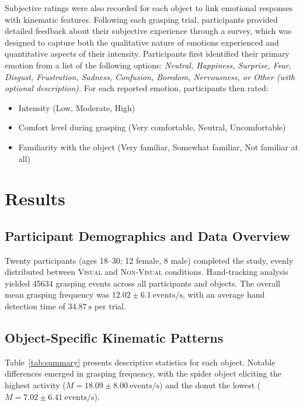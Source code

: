 \documentclass[conference]{IEEEtran}
\begin{document}
Subjective ratings were also recorded for each object to link emotional responses with kinematic features. Following each grasping trial, participants provided detailed feedback about their subjective experience through a survey, which was designed to capture both the qualitative nature of emotions experienced and quantitative aspects of their intensity.
Participants first identified their primary emotion from a list of the following options: \textit{Neutral, Happiness, Surprise, Fear, Disgust, Frustration, Sadness, Confusion, Boredom, Nervousness, or Other (with optional description).}
For each reported emotion, participants then rated:

\begin{itemize}
    \item Intensity (Low, Moderate, High)
    \item Comfort level during grasping (Very comfortable, Neutral, Uncomfortable)
    \item Familiarity with the object (Very familiar, Somewhat familiar, Not familiar at all)
\end{itemize}




\section{Results}
\label{sec:results}

\subsection{Participant Demographics and Data Overview}

Twenty participants (ages 18--30; 12 female, 8 male) completed the study, 
evenly distributed between \textsc{Visual} and \textsc{Non-Visual} conditions.
Hand-tracking analysis yielded \num{45634} grasping events across all 
participants and objects. The overall mean grasping frequency was 
$12.02 \pm 6.1\ \text{events/s}$, with an average hand detection time of 
$34.87\ \text{s}$ per trial.

\subsection{Object-Specific Kinematic Patterns}

Table~\ref{tab:summary} presents descriptive statistics for each object.
Notable differences emerged in grasping frequency, with the spider object 
eliciting the highest activity ($M = 18.09 \pm 8.00\ \text{events/s}$) 
and the donut the lowest ($M = 7.02 \pm 6.41\ \text{events/s}$).
\end{document}
